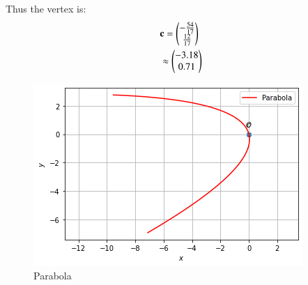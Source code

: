 Thus the vertex is:
\begin{align}
	&\mathbf{c}= \begin{pmatrix}-\frac{54}{17}\\ \frac{12}{17}\end{pmatrix} \\
	&\approx \begin{pmatrix}-3.18\\ 0.71\end{pmatrix}
\end{align}

\begin{figure}[!htbp]
	\centering
	\includegraphics[width =\columnwidth]{solutions/41/1/parabola plot.png}
	\caption{Parabola }
	\label{eq:solutions/41/1/fig:1}
\end{figure}	

